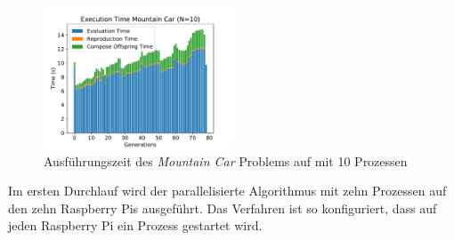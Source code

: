 \begin{figure}[!h]
	\centering
	\includegraphics[width=0.5\textwidth]{./img/mountain_car_analysis/1413_time_10cores_10pis.pdf} 
	\caption{Ausführungszeit des \emph{Mountain Car} Problems auf mit 10 Prozessen }
	\label{fig:mountain_car_time_10cores_10pi}
\end{figure}

Im ersten Durchlauf wird der parallelisierte Algorithmus mit zehn Prozessen auf den zehn Raspberry Pis ausgeführt. Das Verfahren ist so konfiguriert, dass auf jeden Raspberry Pi ein Prozess gestartet wird.





